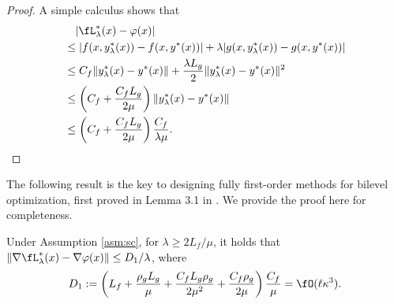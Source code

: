 \begin{proof}
A simple calculus shows that
    \begin{align*}
    &\quad \vert \fL_{\lambda}^*(x) - \varphi(x) \vert \\
    &\le   \vert f(x,y_{\lambda}^*(x)) - f(x,y^*(x)) \vert + \lambda \vert g(x,y_{\lambda}^*(x)) - g(x,y^*(x)) \vert \\
    &\le C_f  \Vert y_{\lambda}^*(x) - y^*(x) \Vert + \frac{\lambda L_g}{2} \Vert y_{\lambda}^*(x) - y^*(x) \Vert^2 \\
    &\le \left(C_f + \frac{C_f L_g}{2 \mu} \right) \Vert y_{\lambda}^*(x) - y^*(x) \Vert \\
    &\le \left(C_f + \frac{C_f L_g}{2 \mu} \right) \frac{C_f }{\lambda \mu}.
    \end{align*}
\end{proof}
The following result is the key to designing fully first-order methods for bilevel optimization, first proved in Lemma 3.1 in \cite{kwon2023fully}. We provide the proof here for completeness.
\begin{lem} \label{lem:key-fully}
Under Assumption \ref{asm:sc}, for $\lambda \ge 2L_f/ \mu$,  it holds that $\Vert \nabla \fL_{\lambda}^*(x) - \nabla \varphi(x) \Vert \le D_1 / \lambda$, where
\begin{align} \label{eq:D-lambda}
    D_1 :=  \left( L_f 
   + \frac{\rho_g L_g}{\mu} + \frac{C_f L_g \rho_g}{2\mu^2} + \frac{C_f \rho_g}{2\mu} 
    \right) \frac{C_f}{\mu} = \fO(\ell \kappa^3).
\end{align}
\end{lem}

